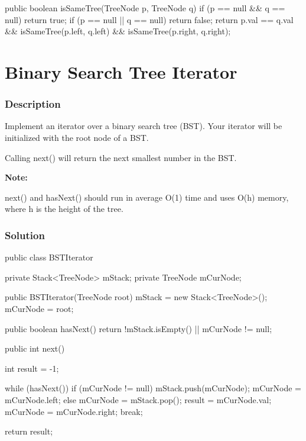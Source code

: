 \begin{Code}
public boolean isSameTree(TreeNode p, TreeNode q) {
    if (p == null && q == null) {
        return true;
    }
    if (p == null || q == null) {
        return false;
    }
    return p.val == q.val && isSameTree(p.left, q.left) && isSameTree(p.right, q.right);
}
\end{Code}

\newpage

\section{Binary Search Tree Iterator} %

\subsubsection{Description}

Implement an iterator over a binary search tree (BST). Your iterator will be initialized with the root node of a BST.

Calling next() will return the next smallest number in the BST.

\textbf{Note:}

next() and hasNext() should run in average O(1) time and uses O(h) memory, where h is the height of the tree.

\subsubsection{Solution}

\begin{Code}
public class BSTIterator {

    private Stack<TreeNode> mStack;
    private TreeNode mCurNode;

    public BSTIterator(TreeNode root) {
        mStack = new Stack<TreeNode>();
        mCurNode = root;
    }

    public boolean hasNext() {
        return !mStack.isEmpty() || mCurNode != null;
    }

    public int next() {
        int result = -1;

        while (hasNext()) {
            if (mCurNode != null) {
                mStack.push(mCurNode);
                mCurNode = mCurNode.left;
            } else {
                mCurNode = mStack.pop();
                result = mCurNode.val;
                mCurNode = mCurNode.right;
                break;
            }
        }

        return result;
    }
}
\end{Code}

